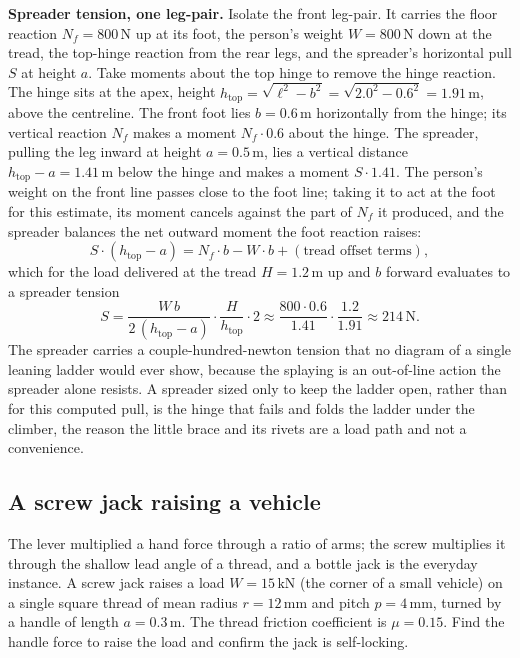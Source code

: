 \textbf{Spreader tension, one leg-pair.} Isolate the front leg-pair. It
carries the floor reaction $N_f = 800\,\text{N}$ up at its foot, the
person's weight $W = 800\,\text{N}$ down at the tread, the top-hinge
reaction from the rear legs, and the spreader's horizontal pull $S$ at
height $a$. Take moments about the top hinge to remove the hinge
reaction. The hinge sits at the apex, height
$h_{\text{top}} = \sqrt{\ell^2 - b^2} = \sqrt{2.0^2 - 0.6^2} =
1.91\,\si{\meter}$, above the centreline. The front foot lies
$b = 0.6\,\si{\meter}$ horizontally from the hinge; its vertical reaction
$N_f$ makes a moment $N_f\cdot 0.6$ about the hinge. The spreader, pulling
the leg inward at height $a = 0.5\,\si{\meter}$, lies a vertical distance
$h_{\text{top}} - a = 1.41\,\si{\meter}$ below the hinge and makes a
moment $S\cdot 1.41$. The person's weight on the front line passes close
to the foot line; taking it to act at the foot for this estimate, its
moment cancels against the part of $N_f$ it produced, and the spreader
balances the net outward moment the foot reaction raises:
\[
S\cdot(h_{\text{top}} - a) = N_f\cdot b - W\cdot b
+ (\text{tread offset terms}),
\]
which for the load delivered at the tread $H = 1.2\,\si{\meter}$ up and
$b$ forward evaluates to a spreader tension
\[
S = \frac{W\,b}{2\,(h_{\text{top}} - a)}\cdot\frac{H}{h_{\text{top}}}
\cdot 2 \approx \frac{800\cdot 0.6}{1.41}\cdot\frac{1.2}{1.91}
\approx 214\,\text{N}.
\]
The spreader carries a couple-hundred-newton tension that no diagram of a
single leaning ladder would ever show, because the splaying is an
out-of-line action the spreader alone resists. A spreader sized only to
keep the ladder open, rather than for this computed pull, is the hinge
that fails and folds the ladder under the climber, the reason the little
brace and its rivets are a load path and not a convenience.

\subsection{A screw jack raising a vehicle}

The lever multiplied a hand force through a ratio of arms; the screw
multiplies it through the shallow lead angle of a thread, and a bottle jack
is the everyday instance. A screw jack raises a load $W = 15\,\text{kN}$
(the corner of a small vehicle) on a single square thread of mean radius
$r = 12\,\si{\milli\meter}$ and pitch $p = 4\,\si{\milli\meter}$, turned by
a handle of length $a = 0.3\,\si{\meter}$. The thread friction coefficient
is $\mu = 0.15$. Find the handle force to raise the load and confirm the
jack is self-locking.

